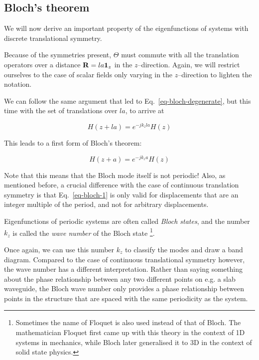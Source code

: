 \subsection {Bloch's theorem}

We will now derive an important property of the eigenfunctions of systems with discrete translational symmetry.

Because of the symmetries present, $\Theta$ must commute with all the translation operators over a distance ${\bf R} = l a {\bf 1}_z$ in the $z$--direction. Again, we will restrict ourselves to the case of scalar fields only varying in the $z$--direction to lighten the notation.

We can follow the same argument that led to Eq.~\ref{eq-bloch-degenerate}, but this time with the set of translations over $la$, to arrive at

\begin{equation}
H(z + la) = e^{-j k_z la} H(z)
\end{equation} 

This leads to a first form of Bloch's theorem:

\begin{equation}
H(z + a) = e^{-j k_z a} H(z) \label{eq-bloch-1}
\end{equation} 

Note that this means that the Bloch mode itself is not periodic! Also, as mentioned before, a crucial difference with the case of continuous translation symmetry is that Eq.~\ref{eq-bloch-1} is only valid for displacements that are an integer multiple of the period, and not for arbitrary displacements.

Eigenfunctions of periodic systems are often called \emph{Bloch states}, and the number $k_z$ is called the \emph{wave number} of the Bloch state \footnote{Sometimes the name of Floquet is also used instead of that of Bloch. The mathematician Floquet first came up with this theory in the context of 1D systems in mechanics, while Bloch later generalised it to 3D in the context of solid state physics.}.

Once again, we can use this number $k_z$ to classify the modes and draw a band diagram. Compared to the case of continuous translational symmetry however, the wave number has a different interpretation. Rather than saying something about the phase relationship between any two different points on e.g. a slab waveguide, the Bloch wave number only provides a phase relationship between points in the structure that are spaced with the same periodicity as the system.

